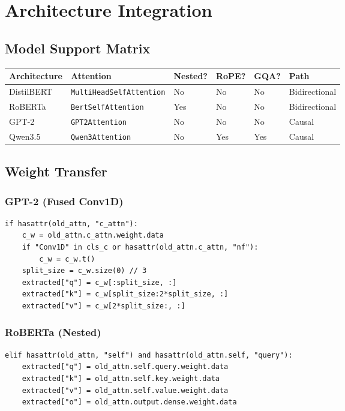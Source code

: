 
\section{Architecture Integration}

\subsection{Model Support Matrix}

\begin{table}[H]
\centering
\small
\begin{tabular}{llllll}
\toprule
\textbf{Architecture} & \textbf{Attention} & \textbf{Nested?} & \textbf{RoPE?} & \textbf{GQA?} & \textbf{Path} \\
\midrule
DistilBERT & \texttt{MultiHeadSelfAttention} & No & No & No & Bidirectional \\
RoBERTa & \texttt{BertSelfAttention} & Yes & No & No & Bidirectional \\
GPT-2 & \texttt{GPT2Attention} & No & No & No & Causal \\
Qwen3.5 & \texttt{Qwen3Attention} & No & Yes & Yes & Causal \\
\bottomrule
\end{tabular}
\end{table}

\subsection{Weight Transfer}

\subsubsection{GPT-2 (Fused Conv1D)}

\begin{lstlisting}
if hasattr(old_attn, "c_attn"):
    c_w = old_attn.c_attn.weight.data
    if "Conv1D" in cls_c or hasattr(old_attn.c_attn, "nf"):
        c_w = c_w.t()
    split_size = c_w.size(0) // 3
    extracted["q"] = c_w[:split_size, :]
    extracted["k"] = c_w[split_size:2*split_size, :]
    extracted["v"] = c_w[2*split_size:, :]
\end{lstlisting}

\subsubsection{RoBERTa (Nested)}

\begin{lstlisting}
elif hasattr(old_attn, "self") and hasattr(old_attn.self, "query"):
    extracted["q"] = old_attn.self.query.weight.data
    extracted["k"] = old_attn.self.key.weight.data
    extracted["v"] = old_attn.self.value.weight.data
    extracted["o"] = old_attn.output.dense.weight.data
\end{lstlisting}

